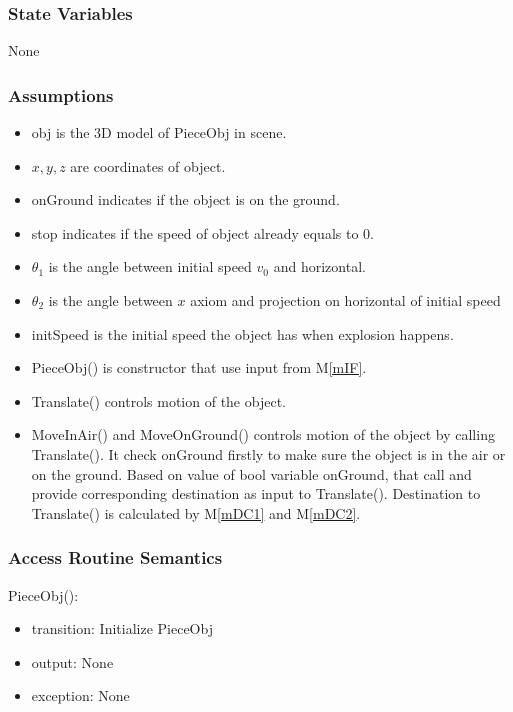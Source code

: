 \documentclass[12pt, titlepage]{article}
\newcommand{\mref}[1]{M\ref{#1}}
\begin{document}
\subsubsection{State Variables}
None
\subsubsection{Assumptions}

\noindent
\begin{itemize}
	\item obj is the 3D model of PieceObj in scene. 	
	\item $x,y,z$ are coordinates of object.	
	\item onGround indicates if the object is on the ground.
	\item stop indicates if the speed of object already equals to 0. 
	\item $\theta_{1}$ is the angle between initial speed $v_{0}$ and horizontal.
	\item $\theta_{2}$ is the angle between $x$ axiom and projection on horizontal of initial speed
	\item initSpeed is the initial speed the object has when explosion happens.
	\item PieceObj() is constructor that use input from \mref{mIF}.
	\item Translate() controls motion of the object.
	\item  MoveInAir() and MoveOnGround() controls motion of the object by calling Translate(). It check onGround firstly to make sure the object is in the air or on the ground. Based on value of bool variable onGround, that call and provide corresponding destination as input to Translate(). Destination to Translate() is calculated by \mref{mDC1} and \mref{mDC2}. \\
\end{itemize}

\subsubsection{Access Routine Semantics}

\noindent PieceObj():
\begin{itemize}
	\item transition: Initialize PieceObj
	\item output: None
	\item exception: None
\end{itemize}
\end{document}
